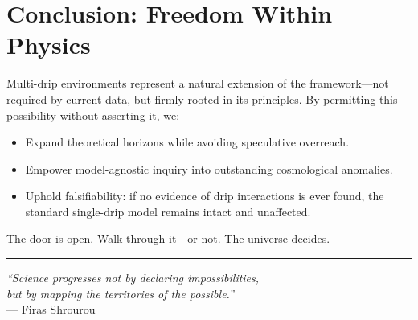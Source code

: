 \documentclass{BSpacePaper} %
\begin{document}
\section{Conclusion: Freedom Within Physics}
Multi-drip environments represent a natural extension of the \bspace{} framework—not required by current data, but firmly rooted in its principles. By permitting this possibility without asserting it, we:
\begin{itemize}
    \item Expand theoretical horizons while avoiding speculative overreach.
    \item Empower model-agnostic inquiry into outstanding cosmological anomalies.
    \item Uphold falsifiability: if no evidence of drip interactions is ever found, the standard single-drip model remains intact and unaffected.
\end{itemize}
The door is open. Walk through it—or not. The universe decides.

\vspace{2em}
\hrule
\vspace{1em}
\begin{flushright}
\textit{“Science progresses not by declaring impossibilities, \\ but by mapping the territories of the possible.”} \\
--- Firas Shrourou
\end{flushright}
\end{document}
